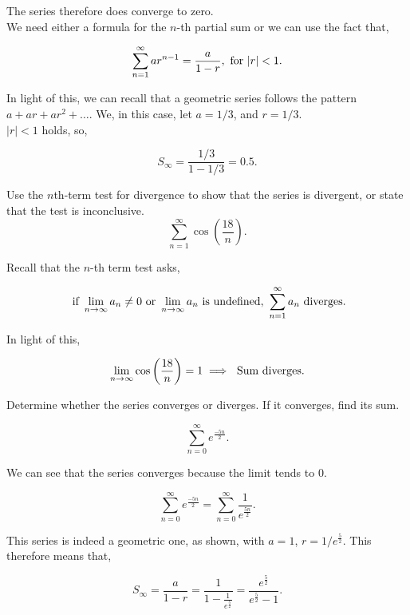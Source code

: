 \documentclass{article}
\begin{document}
            The series therefore does converge to zero. \xmark\\

            \rans We need either a formula for the $n$-th partial sum or we can use the fact that,

            \[\sum_{n = 1}^{\infty}ar^{n-1} = \frac{a}{1 - r},\text{ for } |r| < 1.\]

            In light of this, we can recall that a geometric series follows the pattern $a + ar + ar^2 + \dots$. We, in this case, let $a = 1/3$, and $r = 1/3$.\\

            $|r|< 1$ holds, so,

            \[S_{\infty} = \frac{1/3}{1 - 1/3} = 0.5.\]

            Use the $n$th-term test for divergence to show that the series is divergent, or state that the test is inconclusive.\\

            \[\sum_{n = 1}^{\infty} \cos \left( \frac{18}{n} \right).\]

            \ans Recall that the $n$-th term test asks,

            \[\text{ if } \lim_{n\rightarrow\infty} a_n \neq 0 \text{ or } \lim_{n\rightarrow\infty}a_n \text{ is undefined},~ \sum_{n = 1}^{\infty}a_n \text{ diverges}.\]

            In light of this, 

            \[\lim_{n\rightarrow\infty} \cos \left( \frac{18}{n} \right) = 1 \implies \text{ Sum diverges}.\]

            Determine whether the series converges or diverges. If it converges, find its sum.

            \[\sum_{n = 0}^{\infty}e^{\frac{-5n}{2}}.\]

            \ans We can see that the series converges because the limit tends to 0. 

            \[\sum_{n = 0}^{\infty}e^{\frac{-5n}{2}} = \sum_{n = 0}^{\infty} \frac{1}{e^{\frac{5n}{2}}}.\]
            
            This series is indeed a geometric one, as shown, with $a = 1$, $r = 1/e^{\frac{5}{2}}$. This therefore means that,

            \[S_{\infty} = \frac{a}{1 - r} = \frac{1}{1 - \frac{1}{e^{\frac{5}{2}}}} = \frac{e^{\frac{5}{2}}}{e^{\frac{5}{2}} - 1}.\]

\end{document}
